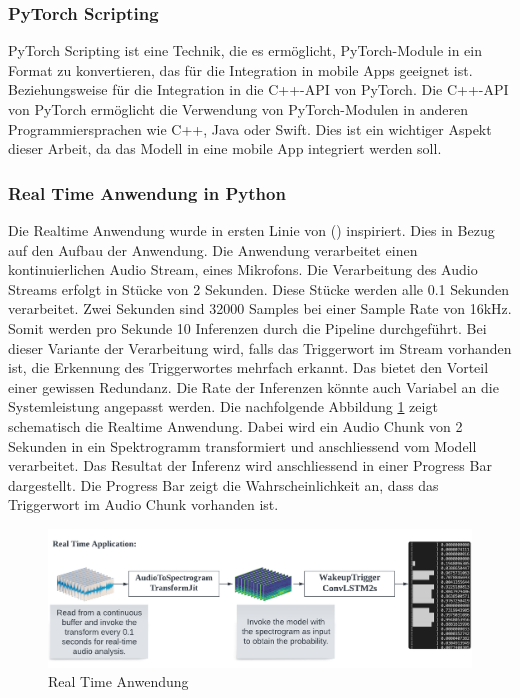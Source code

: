 \documentclass[11pt,a4paper]{article}
\begin{document}
\subsubsection{PyTorch Scripting}
PyTorch Scripting ist eine Technik, die es ermöglicht, PyTorch-Module in ein Format zu konvertieren, 
das für die Integration in mobile Apps geeignet ist. Beziehungsweise für die Integration in die 
C++-API von PyTorch. Die C++-API von PyTorch ermöglicht die Verwendung von PyTorch-Modulen in 
anderen Programmiersprachen wie C++, Java oder Swift. Dies ist ein wichtiger Aspekt dieser Arbeit, 
da das Modell in eine mobile App integriert werden soll.

\subsubsection{Real Time Anwendung in Python}
Die Realtime Anwendung wurde in ersten Linie von (\cite{siri2017hey}) inspiriert. Dies in Bezug 
auf den Aufbau der Anwendung. Die Anwendung verarbeitet einen kontinuierlichen Audio Stream, eines 
Mikrofons. Die Verarbeitung des Audio Streams erfolgt in Stücke von 2 Sekunden. Diese Stücke werden 
alle 0.1 Sekunden verarbeitet. Zwei Sekunden sind 32000 Samples bei einer Sample Rate von 16kHz. 
Somit werden pro Sekunde 10 Inferenzen durch die Pipeline durchgeführt. Bei dieser Variante der 
Verarbeitung wird, falls das Triggerwort im Stream vorhanden ist, die Erkennung des Triggerwortes 
mehrfach erkannt. Das bietet den Vorteil einer gewissen Redundanz. Die Rate der Inferenzen könnte 
auch Variabel an die Systemleistung angepasst werden. Die nachfolgende Abbildung 
\ref{fig:realtime-application} zeigt schematisch die Realtime Anwendung. Dabei wird ein Audio Chunk 
von 2 Sekunden in ein Spektrogramm transformiert und anschliessend vom Modell verarbeitet. Das 
Resultat der Inferenz wird anschliessend in einer Progress Bar dargestellt. Die Progress Bar zeigt 
die Wahrscheinlichkeit an, dass das Triggerwort im Audio Chunk vorhanden ist. 

\begin{figure}[H]
	\centering
	\includegraphics[width=1.0\linewidth]{img/realtime-application.pdf}
	\caption{Real Time Anwendung}
	\label{fig:realtime-application}
\end{figure}
\end{document}
